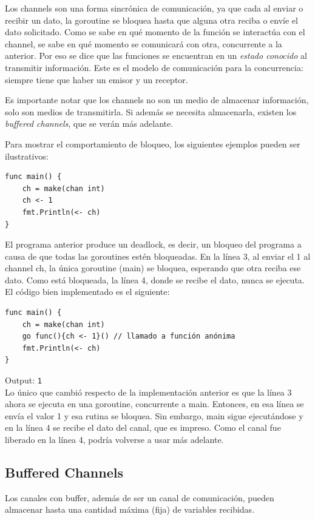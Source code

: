 \documentclass{article}
\begin{document}
Los channels son una forma sincrónica de comunicación, ya que cada al enviar o recibir un dato, la goroutine se bloquea hasta que alguna otra reciba o envíe el dato solicitado. Como se sabe en qué momento de la función se interactúa con el channel, se sabe en qué momento se comunicará con otra, concurrente a la anterior. Por eso se dice que las funciones se encuentran en un \emph{estado conocido} al transmitir información. Este es el modelo de comunicación para la concurrencia: siempre tiene que haber un emisor y un receptor.

Es importante notar que los channels no son un medio de almacenar información, solo son medios de transmitirla. Si además se necesita almacenarla, existen los \emph{buffered channels}, que se verán más adelante.

Para mostrar el comportamiento de bloqueo, los siguientes ejemplos pueden ser ilustrativos:

\begin{lstlisting}[caption = deadlock]
func main() {
	ch = make(chan int)
	ch <- 1
	fmt.Println(<- ch)
}
\end{lstlisting}
El programa anterior produce un deadlock, es decir, un bloqueo del programa a causa de que todas las goroutines estén bloqueadas. En la línea 3, al enviar el 1 al channel ch, la única goroutine (main) se bloquea, esperando que otra reciba ese dato. Como está bloqueada, la línea 4, donde se recibe el dato, nunca se ejecuta. El código bien implementado es el siguiente:
\begin{lstlisting}[caption = envío y recepción básicos.]
func main() {
	ch = make(chan int)
	go func(){ch <- 1}() // llamado a función anónima
	fmt.Println(<- ch)
}
\end{lstlisting}
Output: \verb|1| \\
Lo único que cambió respecto de la implementación anterior es que la línea 3 ahora se ejecuta en una goroutine, concurrente a main. Entonces, en esa línea se envía el valor 1 y esa rutina se bloquea. Sin embargo, main sigue ejecutándose y en la línea 4 se recibe el dato del canal, que es impreso. Como el canal fue liberado en la línea 4, podría volverse a usar más adelante.

\subsection{Buffered Channels}
Los canales con buffer, además de ser un canal de comunicación, pueden almacenar hasta una cantidad máxima (fija) de variables recibidas.
\end{document}
